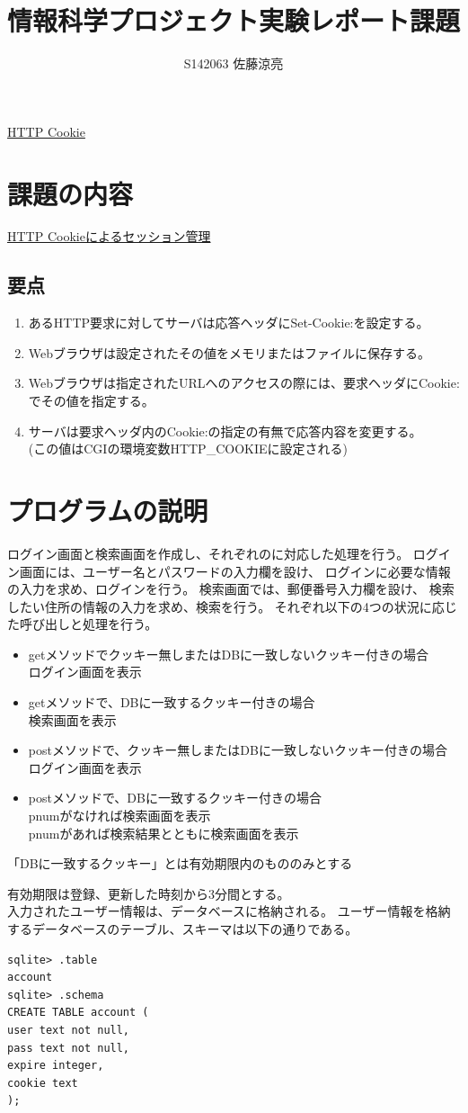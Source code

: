 \documentclass[a4j]{jarticle}
\title{情報科学プロジェクト実験レポート課題}
\author{S142063 佐藤涼亮}
\begin{document}
\maketitle
\centerline{\LARGE \underline{HTTP Cookie}}
\section{課題の内容}
{\large \underline{HTTP Cookieによるセッション管理}}
\subsection{要点}
\begin{enumerate}
\item あるHTTP要求に対してサーバは応答ヘッダにSet-Cookie:を設定する。
\item Webブラウザは設定されたその値をメモリまたはファイルに保存する。
\item Webブラウザは指定されたURLへのアクセスの際には、要求ヘッダにCookie:でその値を指定する。
\item サーバは要求ヘッダ内のCookie:の指定の有無で応答内容を変更する。\\(この値はCGIの環境変数HTTP\_COOKIEに設定される)
\end{enumerate}
\section{プログラムの説明}
ログイン画面と検索画面を作成し、それぞれのに対応した処理を行う。
ログイン画面には、ユーザー名とパスワードの入力欄を設け、
ログインに必要な情報の入力を求め、ログインを行う。
検索画面では、郵便番号入力欄を設け、
検索したい住所の情報の入力を求め、検索を行う。
それぞれ以下の4つの状況に応じた呼び出しと処理を行う。
\begin{itemize}
\item getメソッドでクッキー無しまたはDBに一致しないクッキー付きの場合\\
      ログイン画面を表示
\item getメソッドで、DBに一致するクッキー付きの場合\\
      検索画面を表示
\item postメソッドで、クッキー無しまたはDBに一致しないクッキー付きの場合\\
      ログイン画面を表示
\item postメソッドで、DBに一致するクッキー付きの場合\\
      pnumがなければ検索画面を表示\\pnumがあれば検索結果とともに検索画面を表示
\end{itemize}
\centerline{「DBに一致するクッキー」とは有効期限内のもののみとする}
有効期限は登録、更新した時刻から3分間とする。
\\
入力されたユーザー情報は、データベースに格納される。
ユーザー情報を格納するデータベースのテーブル、スキーマは以下の通りである。
\begin{screen}
\begin{verbatim}
sqlite> .table
account
sqlite> .schema
CREATE TABLE account (
user text not null,
pass text not null,
expire integer,
cookie text
);
\end{verbatim}
\end{screen}
\end{document}
